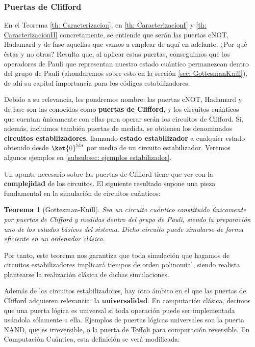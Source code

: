 \documentclass[11pt,a4paper,twoside,pdf]{article}
\numberwithin{equation}{section}
\newtheorem{theorem}{Teorema}
\begin{document}
			\subsubsection*{Puertas de Clifford}
			
			En el Teorema \ref{th: Caracterizacion}, en \ref{th: CaracterizacionI} y \ref{th: CaracterizacionII} concretamente, se entiende que serán las puertas cNOT, Hadamard y de fase aquellas que vamos a emplear de aquí en adelante. ¿Por qué éstas y no otras? Resulta que, al aplicar estas puertas, conseguimos que los operadores de Pauli que representan nuestro estado cuántico permanezcan dentro del grupo de Pauli (ahondaremos sobre esto en la sección \ref{sec: GottesmanKnill}), de ahí su capital importancia para los códigos estabilizadores.
			
			Debido a su relevancia, les pondremos nombre: las puertas cNOT, Hadamard y de fase son las conocidas como \textbf{puertas de Clifford}, y los circuitos cuánticos que cuentan únicamente con ellas para operar serán los circuitos de Clifford. Si, además, incluimos también puertas de medida, se obtienen los denominados \textbf{circuitos estabilizadores}, llamando 
			\textbf{estado estabilizador} a cualquier estado obtenido desde $\ket{0}^{\otimes n}$ por medio de un circuito estabilizador. Veremos algunos ejemplos en \ref{subsubsec: ejemplos estabilizador}.
			
			Un apunte necesario sobre las puertas de Clifford tiene que ver con la \textbf{complejidad} de los circuitos. El siguiente resultado supone una pieza fundamental en la simulación de circuitos cuánticos:
			
			\begin{theorem}[Gottesman-Knill] \label{th: GottesmanKnill}
				Sea un circuito cuántico constituido únicamente por puertas de Clifford y medidas dentro del grupo de Pauli, siendo la preparación uno de los estados básicos del sistema. Dicho circuito puede simularse de forma eficiente en un ordenador clásico.
			\end{theorem}
			
			Por tanto, este teorema nos garantiza que toda simulación que hagamos de circuitos estabilizadores implicará tiempos de orden polinomial, siendo realista plantearse la realización clásica de dichas simulaciones.

			Además de los circuitos estabilizadores, hay otro ámbito en el que las puertas de Clifford adquieren relevancia: la \textbf{universalidad}. En computación clásica, decimos que una puerta lógica es universal si toda operación puede ser implementada usándola sólamente a ella. Ejemplos de puertas lógicas universales son la puerta NAND, que es irreversible, o la puerta de Toffoli para computación reversible. En Computación Cuántica, esta definición se verá modificada:
			
\end{document}

